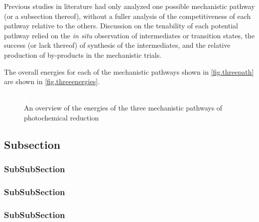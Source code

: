 Previous studies in literature had only analyzed one possible mechanistic pathway (or a subsection thereof), without a fuller analysis of the competitiveness of each pathway relative to the others. Discussion on the tenability of each potential pathway relied on the \textit{in situ} observation of intermediates or transition states, the success (or lack thereof) of synthesis of the intermediates, and the relative production of by-products in the mechanistic trials.

The overall energies for each of the mechanistic pathways shown in \autoref{fig.threepath} are shown in \autoref{fig.threeenergies}. 


\begin{figure}[!htbp]
 \begin{center}
  \includegraphics[clip=true]{images/insertgraphic.eps}
 \end{center}
\caption[Reaction energies for three mechanistic pathways]{An overview of the energies of the three mechanistic pathways of photochemical  reduction}
\label{fig.threeenergies}
\end{figure} 



\subsection{Subsection}

\subsubsection{SubSubSection}

\subsubsection{SubSubSection}

\subsubsection{SubSubSection}
